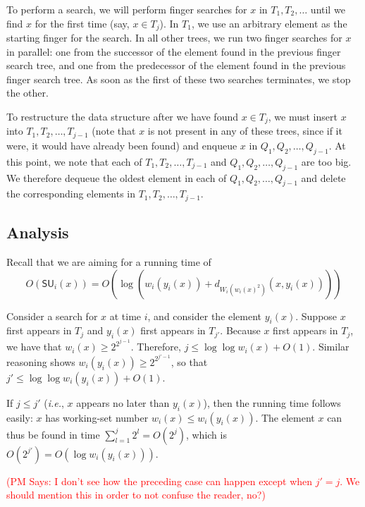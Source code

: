 \documentclass{llncs}
\newcommand{\ie}{\textsl{i.e.}}
\newcommand{\BigOh}[1]{O\!\left(#1\right)}
\newcommand{\SU}[1]{\textsf{SU}_i\!\left(#1\right)}
\newcommand{\pat}[1]{\textcolor{red}{(PM Says: #1)}}
\begin{document}
To perform a search, we will perform finger searches for $x$ in $T_1,T_2,\ldots$ until we find $x$ for the first time (say, $x \in T_j$). In $T_1$, we use an arbitrary element as the starting finger for the search. In all other trees, we run two finger searches for $x$ in parallel: one from the successor of the element found in the previous finger search tree, and one from the predecessor of the element found in the previous finger search tree. As soon as the first of these two searches terminates, we stop the other. 

To restructure the data structure after we have found $x \in T_j$, we must insert $x$ into $T_1,T_2,\ldots,T_{j-1}$ (note that $x$ is not present in any of these trees, since if it were, it would have already been found) and enqueue $x$ in $Q_1,Q_2,\ldots,Q_{j-1}$. At this point, we note that each of $T_1,T_2,\ldots,T_{j-1}$ and $Q_1,Q_2,\ldots,Q_{j-1}$ are too big. We therefore dequeue the oldest element in each of $Q_1,Q_2,\ldots,Q_{j-1}$ and delete the corresponding elements in $T_1,T_2,\ldots,T_{j-1}$.

\subsection{Analysis}
\label{section:main:analysis}

Recall that we are aiming for a running time of
\begin{displaymath}
	\BigOh{\SU{x}} = \BigOh{\log (w_i(y_i(x)) + d_{W_i(w_i(x)^2)}(x,y_i(x)))}
\end{displaymath}

Consider a search for $x$ at time $i$, and consider the element $y_i(x)$. Suppose $x$ first appears in $T_j$ and $y_i(x)$ first appears in $T_{j'}$. Because $x$ first appears in $T_j$, we have that $w_i(x) \ge 2^{2^{j-1}}$. Therefore, $j \le \log \log w_i(x) + \BigOh{1}$. Similar reasoning shows $w_i(y_i(x)) \ge 2^{2^{j'-1}}$, so that $j' \le \log \log w_i(y_i(x)) + \BigOh{1}$.

If $j \le j'$ (\ie, $x$ appears no later than $y_i(x)$), then the running time follows easily: $x$ has working-set number $w_i(x) \le w_i(y_i(x))$. The element $x$ can thus be found in time $\sum_{l=1}^j 2^l = \BigOh{2^j}$, which is $\BigOh{2^{j'}} = \BigOh{\log w_i(y_i(x))}$.

\pat{I don't see how the preceding case can happen except when $j'=j$.  We should mention this in order to not confuse the reader, no?}
\end{document}
